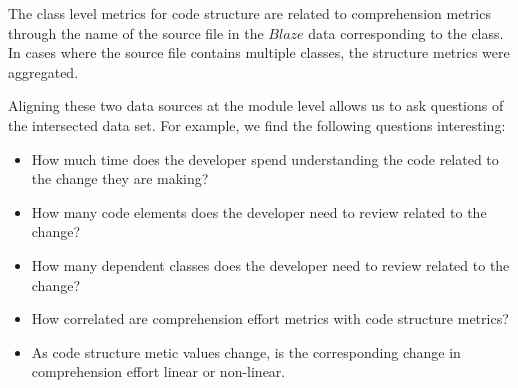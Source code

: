 The class level metrics for code structure are related to comprehension metrics through the name of the source file in the $Blaze$ data corresponding to the class.  In cases where the source file contains multiple classes, the structure metrics were aggregated.

Aligning these two data sources at the module level allows us to ask questions of the intersected data set.  For example, we find the following questions interesting:

\begin{itemize}
	\item[] How much time does the developer spend understanding the code related to the change they are making?
	\item[] How many code elements does the developer need to review related to the change?
	\item[] How many dependent classes does the developer need to review related to the change?
	\item[] How correlated are comprehension effort metrics with code structure metrics?
	\item[] As code structure metic values change, is the corresponding change in comprehension effort linear or non-linear.
\end{itemize}